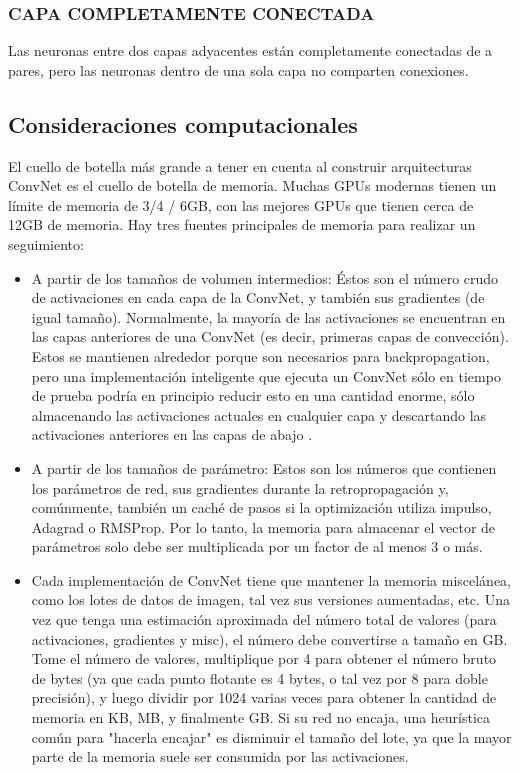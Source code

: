 \documentclass[a4paper,12pt,spanish]{book}
\begin{document}
      \subsubsection{CAPA COMPLETAMENTE CONECTADA} 
	Las neuronas entre dos capas adyacentes están completamente conectadas de a pares, pero las neuronas dentro de una sola capa no comparten conexiones.

    \subsection {Consideraciones computacionales}
      El cuello de botella más grande a tener en cuenta al construir arquitecturas ConvNet es el cuello de botella de memoria. 
      Muchas GPUs modernas tienen un límite de memoria de 3/4 / 6GB, con las mejores GPUs que tienen cerca de 12GB de memoria. 
      Hay tres fuentes principales de memoria para realizar un seguimiento:
      \begin{itemize}
	\item A partir de los tamaños de volumen intermedios: Éstos son el número crudo de activaciones en cada capa de la ConvNet, y también sus gradientes (de igual tamaño). Normalmente, la mayoría de las activaciones se encuentran en las capas anteriores de una ConvNet (es decir, primeras capas de convección). Estos se mantienen alrededor porque son necesarios para backpropagation, pero una implementación inteligente que ejecuta un ConvNet sólo en tiempo de prueba podría en principio reducir esto en una cantidad enorme, sólo almacenando las activaciones actuales en cualquier capa y descartando las activaciones anteriores en las capas de abajo .
	\item A partir de los tamaños de parámetro: Estos son los números que contienen los parámetros de red, sus gradientes durante la retropropagación y, comúnmente, también un caché de pasos si la optimización utiliza impulso, Adagrad o RMSProp. Por lo tanto, la memoria para almacenar el vector de parámetros solo debe ser multiplicada por un factor de al menos 3 o más.
	\item Cada implementación de ConvNet tiene que mantener la memoria miscelánea, como los lotes de datos de imagen, tal vez sus versiones aumentadas, etc.
	Una vez que tenga una estimación aproximada del número total de valores (para activaciones, gradientes y misc), el número debe convertirse a tamaño en GB. Tome el número de valores, multiplique por 4 para obtener el número bruto de bytes (ya que cada punto flotante es 4 bytes, o tal vez por 8 para doble precisión), y luego dividir por 1024 varias veces para obtener la cantidad de memoria en KB, MB, y finalmente GB. Si su red no encaja, una heurística común para "hacerla encajar" es disminuir el tamaño del lote, ya que la mayor parte de la memoria suele ser consumida por las activaciones.
      \end{itemize}
\end{document}
